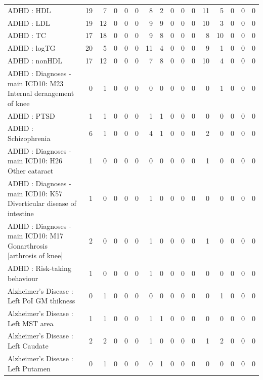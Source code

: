 \begin{table}[ht]
\begin{tabular}{lrrrrrrrrrrrrrrr}
  ADHD : HDL &  19 &   7 &   0 &   0 &   0 &   8 &   2 &   0 &   0 &   0 &  11 &   5 &   0 &   0 &   0 \\ 
  ADHD : LDL &  19 &  12 &   0 &   0 &   0 &   9 &   9 &   0 &   0 &   0 &  10 &   3 &   0 &   0 &   0 \\ 
  ADHD : TC &  17 &  18 &   0 &   0 &   0 &   9 &   8 &   0 &   0 &   0 &   8 &  10 &   0 &   0 &   0 \\ 
  ADHD : logTG &  20 &   5 &   0 &   0 &   0 &  11 &   4 &   0 &   0 &   0 &   9 &   1 &   0 &   0 &   0 \\ 
  ADHD : nonHDL &  17 &  12 &   0 &   0 &   0 &   7 &   8 &   0 &   0 &   0 &  10 &   4 &   0 &   0 &   0 \\ 
  ADHD : Diagnoses - main ICD10: M23 Internal derangement of knee &   0 &   1 &   0 &   0 &   0 &   0 &   0 &   0 &   0 &   0 &   0 &   1 &   0 &   0 &   0 \\ 
  ADHD : PTSD &   1 &   1 &   0 &   0 &   0 &   1 &   1 &   0 &   0 &   0 &   0 &   0 &   0 &   0 &   0 \\ 
  ADHD : Schizophrenia &   6 &   1 &   0 &   0 &   0 &   4 &   1 &   0 &   0 &   0 &   2 &   0 &   0 &   0 &   0 \\ 
  ADHD : Diagnoses - main ICD10: H26 Other cataract &   1 &   0 &   0 &   0 &   0 &   0 &   0 &   0 &   0 &   0 &   1 &   0 &   0 &   0 &   0 \\ 
  ADHD : Diagnoses - main ICD10: K57 Diverticular disease of intestine &   1 &   0 &   0 &   0 &   0 &   1 &   0 &   0 &   0 &   0 &   0 &   0 &   0 &   0 &   0 \\ 
  ADHD : Diagnoses - main ICD10: M17 Gonarthrosis [arthrosis of knee] &   2 &   0 &   0 &   0 &   0 &   1 &   0 &   0 &   0 &   0 &   1 &   0 &   0 &   0 &   0 \\ 
  ADHD : Risk-taking behaviour &   1 &   0 &   0 &   0 &   0 &   1 &   0 &   0 &   0 &   0 &   0 &   0 &   0 &   0 &   0 \\ 
  Alzheimer's Disease : Left PoI GM thikness &   0 &   1 &   0 &   0 &   0 &   0 &   0 &   0 &   0 &   0 &   0 &   1 &   0 &   0 &   0 \\ 
  Alzheimer's Disease : Left MST area &   1 &   1 &   0 &   0 &   0 &   1 &   1 &   0 &   0 &   0 &   0 &   0 &   0 &   0 &   0 \\ 
  Alzheimer's Disease : Left Caudate &   2 &   2 &   0 &   0 &   0 &   1 &   0 &   0 &   0 &   0 &   1 &   2 &   0 &   0 &   0 \\ 
  Alzheimer's Disease : Left Putamen &   0 &   1 &   0 &   0 &   0 &   0 &   1 &   0 &   0 &   0 &   0 &   0 &   0 &   0 &   0 \\ 

\end{tabular}
\end{table}
